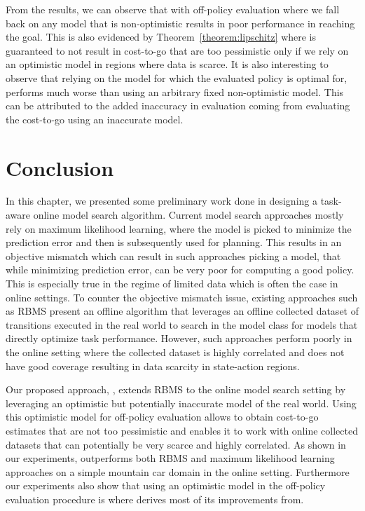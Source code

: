 From the results, we can observe that \taml{} with off-policy
evaluation where we fall back on any model that is non-optimistic
results in poor performance in reaching the goal. This is also
evidenced by Theorem~\ref{theorem:lipschitz} where \taml{} is
guaranteed to not result in cost-to-go that are too pessimistic only
if we rely on an optimistic model in regions where data is scarce. It
is also interesting to observe that relying on the model for which the
evaluated policy is optimal for, performs much worse than using an
arbitrary fixed non-optimistic model. This can be attributed to the
added inaccuracy in evaluation coming from evaluating the cost-to-go
using an inaccurate model. 

\section{Conclusion}
\label{sec:discussion-1}

In this chapter, we presented some preliminary work done in designing
a task-aware online model search algorithm. Current model search
approaches mostly rely on maximum likelihood learning, where the model
is picked to minimize the prediction error and then is subsequently
used for planning. This results in an objective mismatch which can
result in such approaches picking a model, that while minimizing
prediction error, can be very poor for computing a good policy. This
is especially true in the regime of limited data which is often the
case in online settings. To counter the objective mismatch issue,
existing approaches such as RBMS present an offline algorithm that
leverages an offline collected dataset of transitions executed in the
real world to search in the model class for models that directly
optimize task performance. However, such approaches perform poorly in
the online setting where the collected dataset is highly correlated
and does not have good coverage resulting in data scarcity in
state-action regions.

Our proposed approach, \taml{}, extends RBMS to the online model
search setting by leveraging an optimistic but potentially inaccurate
model of the real world. Using this optimistic model for off-policy
evaluation allows \taml{} to obtain cost-to-go estimates that are not
too pessimistic and enables it to work with online collected datasets
that can potentially be very scarce and highly correlated. As shown in
our experiments, \taml{} outperforms both RBMS and maximum likelihood
learning approaches on a simple mountain car domain in the online
setting. Furthermore our experiments also show that using an
optimistic model in the off-policy evaluation procedure is where
\taml{} derives most of its improvements from.

  
